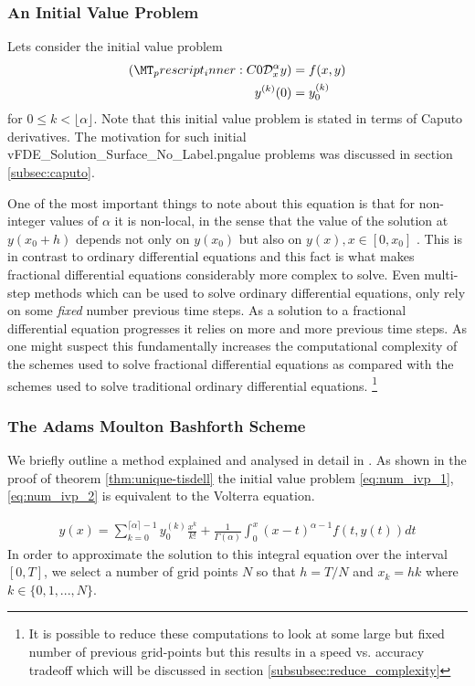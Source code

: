 \subsubsection{An Initial Value Problem}
Lets consider the initial value problem
\begin{align}
    \label{eq:num_ivp_1}
    \capder{0}{x}{\alpha}{y} &= f(x,y) \\
    \label{eq:num_ivp_2}
    y^{(k)}(0) &= y_{0}^{(k)} 
\end{align}
for $ 0 \leq k < \lfloor \alpha \rfloor $. Note that this initial value problem is stated in terms of Caputo derivatives. The motivation for such initial vFDE_Solution_Surface_No_Label.pngalue problems was discussed in section \ref{subsec:caputo}.

One of the most important things to note about this equation is that for non-integer values of $ \alpha $ it is non-local, in the sense that the value of the solution at $ y(x_0+h) $ depends not only on $ y(x_0) $ but also on $ y(x), x \in [0, x_0] $ \cite{Diethelm2010}. This is in contrast to ordinary differential equations and this fact is what makes fractional differential equations considerably more complex to solve. Even multi-step methods which can be used to solve ordinary differential equations, only rely on some \emph{fixed} number previous time steps. As a solution to a fractional differential equation progresses it relies on more and more previous time steps. As one might suspect this fundamentally increases the computational complexity of the schemes used to solve fractional differential equations as compared with the schemes used to solve traditional ordinary differential equations. \footnote{It is possible to reduce these computations to look at some large but fixed number of previous grid-points 
but this results in a speed vs. accuracy tradeoff which will be discussed in section \ref{subsubsec:reduce_complexity}}

\subsubsection{The Adams Moulton Bashforth Scheme}
\label{sec:amb_desc}
We briefly outline a method explained and analysed in detail in \cite{Diethelm2004}. As shown in the proof of theorem \ref{thm:unique-tisdell} the initial value problem \eqref{eq:num_ivp_1}, \eqref{eq:num_ivp_2} is equivalent to the Volterra equation.

\begin{align}
    \label{eq:num_int_eq}
    y(x) = \sum_{k=0}^{\lceil \alpha \rceil - 1} y_{0}^{(k)} \frac{x^k}{k!} + \frac{1}{\Gamma(\alpha)} \int_0^x (x-t)^{\alpha - 1} f(t, y(t))dt
\end{align}
In order to approximate the solution to this integral equation over the interval $ [0, T] $, we select a number of grid points $ N $ so that $ h = T / N $ and $ x_k = hk $ where $ k \in \{0, 1, ..., N\} $.

